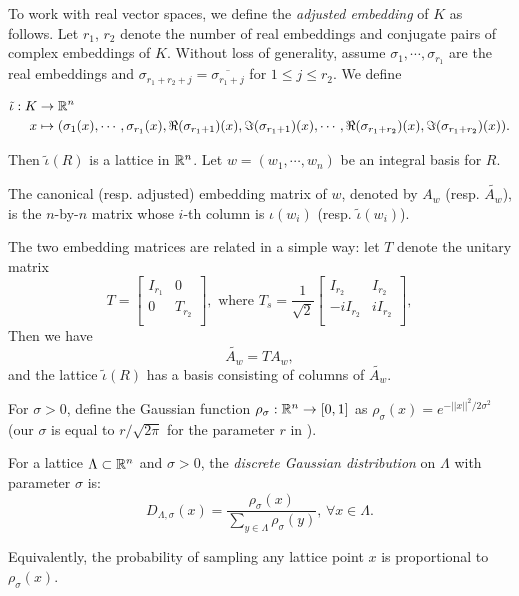 \documentclass{amsart}
\begin{document}
To work with real vector spaces, we define the {\it adjusted embedding} of $K$ as follows. Let $r_1$, $r_2$ denote the number of real embeddings and conjugate pairs of complex embeddings of $K$. Without loss of generality, assume $\sigma_1, \cdots, \sigma_{r_1}$ are the real embeddings and $\sigma_{r_1+r_2+j} = \overline{\sigma_{r_1 + j}}$ for $1 \leq j \leq r_2$. We define

\begin{align*}
    \tilde{\iota}: K & \to \mathbb{R}^n \\
    x & \mapsto (\sigma_1(x), \cdots, \sigma_{r_1}(x), \Re(\sigma_{r_1+1})(x), \Im(\sigma_{r_1+1})(x), \cdots,  \Re(\sigma_{r_1+r_2})(x), \Im(\sigma_{r_1+r_2})(x)).
\end{align*}

Then $\tilde{\iota}(R)$ is a lattice in $\mathbb{R}^n$. Let $w = (w_1, \cdots , w_n)$ be an integral basis for $R$.

\begin{Definition}
The canonical (resp. adjusted) embedding matrix of $w$, denoted by $A_w$ (resp. $\widetilde{A_w}$), is the $n$-by-$n$ matrix whose $i$-th column is $\iota(w_i)$ (resp. $\tilde{\iota}(w_i)$).
\end{Definition}

The two embedding matrices are related in a simple way:
let $T$ denote the unitary matrix
\[
T = \begin{bmatrix}
    I_{r_1}  & 0  \\
    0     & T_{r_2} \\
\end{bmatrix},
\mbox{ where } T_s = \frac{1}{\sqrt{2}} \begin{bmatrix}
    I_{r_2}  & I_{r_2} \\
    -iI_{r_2}     & iI_{r_2} \\
\end{bmatrix},
\]
Then we have
$$\widetilde{A_{w}} = T A_{w},$$
and the lattice $\tilde{\iota}(R)$ has a basis consisting of columns of $\widetilde{A_{w}}$.

For $\sigma > 0$, define the Gaussian function $\rho_\sigma: \mathbb{R}^n \to [0,1]$ as $\rho_\sigma(x) = e^{-||x||^2/2\sigma^2}$ (our $\sigma$ is equal to $r/\sqrt{2\pi}$ for the parameter $r$ in \cite{lyubashevsky2013ideal}).
\begin{Definition}
For a lattice $\Lambda \subset \mathbb{R}^n$ and $\sigma > 0$, the {\it discrete Gaussian distribution} on $\Lambda$ with parameter $\sigma$ is:
\[
    D_{\Lambda, \sigma}(x) = \frac{\rho_\sigma(x)}{\sum_{y \in\Lambda} \rho_\sigma(y)}, \, \forall x \in \Lambda.
\]
\end{Definition}
Equivalently, the probability of sampling any lattice point $x$ is proportional to $\rho_\sigma(x)$.
\end{document}
